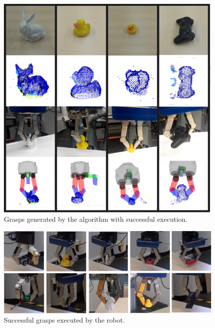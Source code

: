 \begin{figure}[!htpb]
\centering
\includegraphics[width=0.8\linewidth]{figure/successful_grasps_illustration.pdf}
\caption{Grasps generated by the algorithm with successful execution.}
\label{fig:grasp_example} 
\end{figure}

\begin{figure}[!htpb]
\centering
\includegraphics[width=0.8\linewidth]{figure/success_grasp_real.png}
\caption{Successful grasps executed by the robot. }
\label{fig:success_grasps}
\end{figure}



